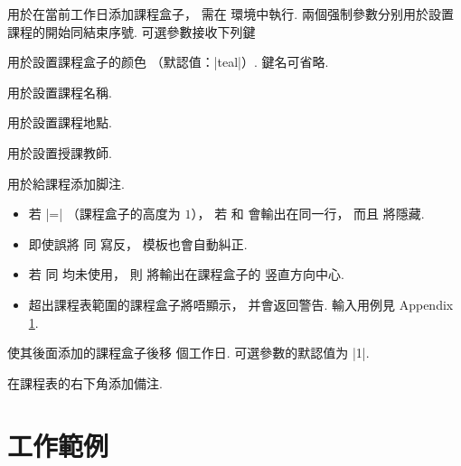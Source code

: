 \documentclass[svgnames]{l3doc}
\begin{document}
\begin{documentation}
\begin{function}{\course}
  \begin{syntax}
         
  \end{syntax}
  用於在當前工作日添加課程盒子，
  需在  環境中執行.
  兩個强制參數分别用於設置課程的開始同結束序號.
  可選參數接收下列鍵
  \begin{keyval}
    \item [\key{color}]  用於設置課程盒子的颜色
    （默認值：|teal|）. 鍵名可省略.
    \item [\key{subject}]  用於設置課程名稱.
    \item [\key{location}]  用於設置課程地點.
    \item [\key{lecture}]  用於設置授課教師.
    \item [\key{comment}]  用於給課程添加脚注.
  \end{keyval}
  \begin{texnote}
    \begin{itemize}[leftmargin = 2em]
      \item 若  |=| （課程盒子的高度为 $1$），
      若  和  會輸出在同一行，
      而且  將隱藏.
      \item 即使誤將  同  寫反，
      模板也會自動糾正.
      \item 若  同  均未使用，
      則  將輸出在課程盒子的
      竖直方向中心.
      \item 超出課程表範圍的課程盒子將唔顯示，
      并會返回警告.
      輸入用例見 Appendix \ref{mwe}.
    \end{itemize}
  \end{texnote}
\end{function}

\begin{function}{\newday}
  \begin{syntax}
     
  \end{syntax}
  使其後面添加的課程盒子後移  個工作日.
  可選參數的默認值为 |1|.
\end{function}

\begin{function}{\more}
  \begin{syntax}
     
  \end{syntax}
  在課程表的右下角添加備注.
\end{function}

\clearpage \appendix \linespread{1.25}

\section{工作範例} \label{mwe}





\end{documentation}
\end{document}
